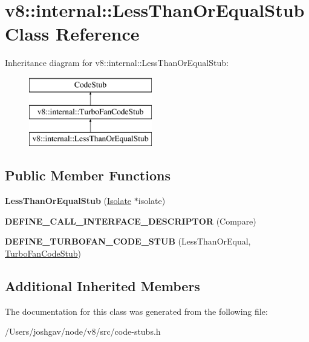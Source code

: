 \hypertarget{classv8_1_1internal_1_1_less_than_or_equal_stub}{}\section{v8\+:\+:internal\+:\+:Less\+Than\+Or\+Equal\+Stub Class Reference}
\label{classv8_1_1internal_1_1_less_than_or_equal_stub}
Inheritance diagram for v8\+:\+:internal\+:\+:Less\+Than\+Or\+Equal\+Stub\+:\begin{figure}[H]
\begin{center}
\leavevmode
\includegraphics[height=3.000000cm]{classv8_1_1internal_1_1_less_than_or_equal_stub}
\end{center}
\end{figure}
\subsection*{Public Member Functions}
\begin{DoxyCompactItemize}
\item 
{\bfseries Less\+Than\+Or\+Equal\+Stub} (\hyperlink{classv8_1_1internal_1_1_isolate}{Isolate} $\ast$isolate)\hypertarget{classv8_1_1internal_1_1_less_than_or_equal_stub_a85cab6379563906d6ef126c9302b80e8}{}\label{classv8_1_1internal_1_1_less_than_or_equal_stub_a85cab6379563906d6ef126c9302b80e8}

\item 
{\bfseries D\+E\+F\+I\+N\+E\+\_\+\+C\+A\+L\+L\+\_\+\+I\+N\+T\+E\+R\+F\+A\+C\+E\+\_\+\+D\+E\+S\+C\+R\+I\+P\+T\+OR} (Compare)\hypertarget{classv8_1_1internal_1_1_less_than_or_equal_stub_afaaf2bfcfb582bf49085e8c5c5ce7582}{}\label{classv8_1_1internal_1_1_less_than_or_equal_stub_afaaf2bfcfb582bf49085e8c5c5ce7582}

\item 
{\bfseries D\+E\+F\+I\+N\+E\+\_\+\+T\+U\+R\+B\+O\+F\+A\+N\+\_\+\+C\+O\+D\+E\+\_\+\+S\+T\+UB} (Less\+Than\+Or\+Equal, \hyperlink{classv8_1_1internal_1_1_turbo_fan_code_stub}{Turbo\+Fan\+Code\+Stub})\hypertarget{classv8_1_1internal_1_1_less_than_or_equal_stub_aae74c5229b6a7069def9aaf81bd50ae2}{}\label{classv8_1_1internal_1_1_less_than_or_equal_stub_aae74c5229b6a7069def9aaf81bd50ae2}

\end{DoxyCompactItemize}
\subsection*{Additional Inherited Members}


The documentation for this class was generated from the following file\+:\begin{DoxyCompactItemize}
\item 
/\+Users/joshgav/node/v8/src/code-\/stubs.\+h\end{DoxyCompactItemize}
